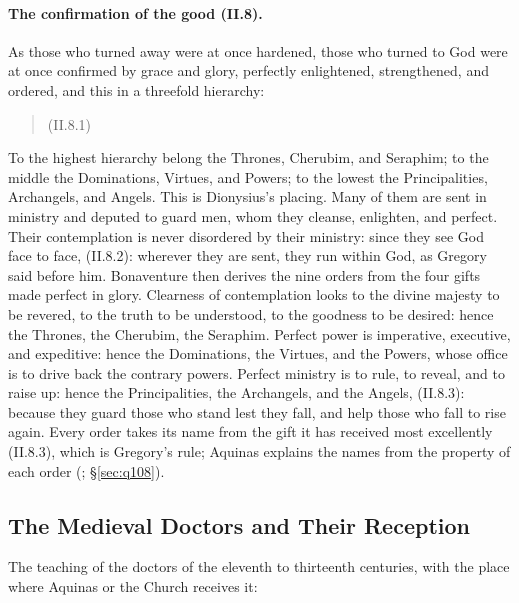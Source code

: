 \paragraph{The confirmation of the good (II.8).} As those who turned away
were at once hardened, those who turned to God were at once confirmed by
grace and glory, perfectly enlightened, strengthened, and ordered, and this
in a threefold hierarchy:

\begin{quote}
 (II.8.1)
\end{quote}

\noindent To the highest hierarchy belong the Thrones, Cherubim, and
Seraphim; to the middle the Dominations, Virtues, and Powers; to the lowest
the Principalities, Archangels, and Angels. This is Dionysius's placing.
Many of them are sent in ministry and deputed to guard men, whom they
cleanse, enlighten, and perfect. Their contemplation is never disordered by
their ministry: since they see God face to face,  (II.8.2): wherever they are sent, they run within God,
as Gregory said before him. Bonaventure then derives the nine orders from
the four gifts made perfect in glory. Clearness of contemplation looks to
the divine majesty to be revered, to the truth to be understood, to the
goodness to be desired: hence the Thrones, the Cherubim, the Seraphim.
Perfect power is imperative, executive, and expeditive: hence the
Dominations, the Virtues, and the Powers, whose office is to drive back the
contrary powers. Perfect ministry is to rule, to reveal, and to raise up:
hence the Principalities, the Archangels, and the Angels,  (II.8.3):
because they guard those who stand lest they fall, and help those who fall
to rise again. Every order takes its name from the gift it has received
most excellently (II.8.3), which is Gregory's rule; Aquinas explains the
names from the property of each order (;
\S\ref{sec:q108}).

\sectionguard
\subsection{The Medieval Doctors and Their Reception}

The teaching of the doctors of the eleventh to thirteenth centuries, with
the place where Aquinas or the Church receives it:

